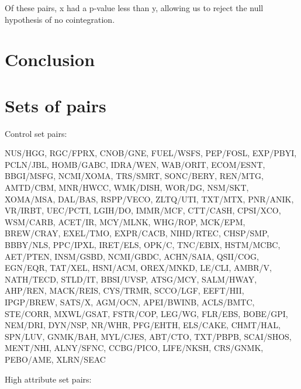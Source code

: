 \documentclass{UoYCSproject}
\begin{document}
Of these pairs, x had a p-value less than y, allowing us to reject the null hypothesis of no cointegration.

\chapter{Conclusion}
\label{cha:conclusion}

\appendix
\chapter{Sets of pairs}

Control set pairs:

NUS/HGG, RGC/FPRX, CNOB/GNE, FUEL/WSFS, PEP/FOSL, EXP/PBYI, PCLN/JBL, HOMB/GABC, IDRA/WEN, WAB/ORIT, ECOM/ESNT, BBGI/MSFG, NCMI/XOMA, TRS/SMRT, SONC/BERY, REN/MTG, AMTD/CBM, MNR/HWCC, WMK/DISH, WOR/DG, NSM/SKT, XOMA/MSA, DAL/BAS, RSPP/VECO, ZLTQ/UTI, TXT/MTX, PNR/ANIK, VR/IRBT, UEC/PCTI, LGIH/DO, IMMR/MCF, CTT/CASH, CPSI/XCO, WSM/CARB, ACET/IR, MCY/MLNK, WHG/ROP, MCK/EPM, BREW/CRAY, EXEL/TMO, EXPR/CACB, NIHD/RTEC, CHSP/SMP, BBBY/NLS, PPC/IPXL, IRET/ELS, OPK/C, TNC/EBIX, HSTM/MCBC, AET/PTEN, INSM/GSBD, NCMI/GBDC, ACHN/SAIA, QSII/COG, EGN/EQR, TAT/XEL, HSNI/ACM, OREX/MNKD, LE/CLI, AMBR/V, NATH/TECD, STLD/IT, BBSI/UVSP, ATSG/MCY, SALM/HWAY, AHP/REN, MACK/REIS, CYS/TRMR, SCCO/LGF, EEFT/HII, IPGP/BREW, SATS/X, AGM/OCN, APEI/BWINB, ACLS/BMTC, STE/CORR, MXWL/GSAT, FSTR/COP, LEG/WG, FLR/EBS, BOBE/GPI, NEM/DRI, DYN/NSP, NR/WHR, PFG/EHTH, ELS/CAKE, CHMT/HAL, SPN/LUV, GNMK/BAH, MYL/CJES, ABT/CTO, TXT/PBPB, SCAI/SHOS, MENT/NHI, ALNY/SFNC, CCBG/PICO, LIFE/NKSH, CRS/GNMK, PEBO/AME, XLRN/SEAC

High attribute set pairs: 

\printbibliography
\end{document}
